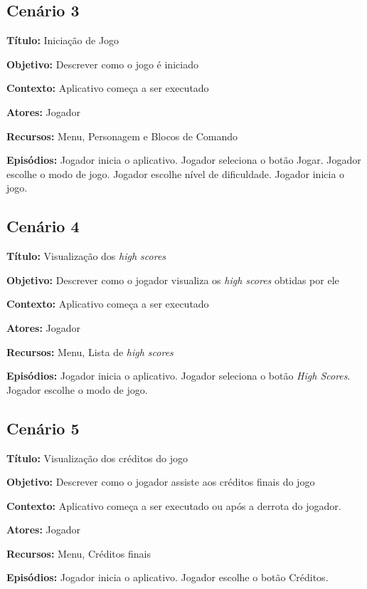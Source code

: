 \subsection{Cenário 3}

\textbf{Título:} Iniciação de Jogo

\textbf{Objetivo:} Descrever como o jogo é iniciado

\textbf{Contexto:} Aplicativo começa a ser executado 

\textbf{Atores:} Jogador

\textbf{Recursos:} Menu, Personagem e Blocos de Comando

\textbf{Episódios:} Jogador inicia o aplicativo. Jogador seleciona o botão Jogar. Jogador escolhe o modo de jogo. Jogador escolhe nível de dificuldade. Jogador inicia o jogo.

\subsection{Cenário 4}

\textbf{Título:} Visualização dos \textit{high scores}

\textbf{Objetivo:} Descrever como o jogador visualiza os \textit{high scores} obtidas por ele

\textbf{Contexto:} Aplicativo começa a ser executado

\textbf{Atores:} Jogador

\textbf{Recursos:} Menu, Lista de \textit{high scores}

\textbf{Episódios:} Jogador inicia o aplicativo. Jogador seleciona o botão \textit{High Scores}. Jogador escolhe o modo de jogo.

\subsection{Cenário 5}

\textbf{Título:} Visualização dos créditos do jogo

\textbf{Objetivo:} Descrever como o jogador assiste aos créditos finais do jogo

\textbf{Contexto:} Aplicativo começa a ser executado ou após a derrota do jogador.

\textbf{Atores:} Jogador

\textbf{Recursos:} Menu, Créditos finais

\textbf{Episódios:} Jogador inicia o aplicativo. Jogador escolhe o botão Créditos.


